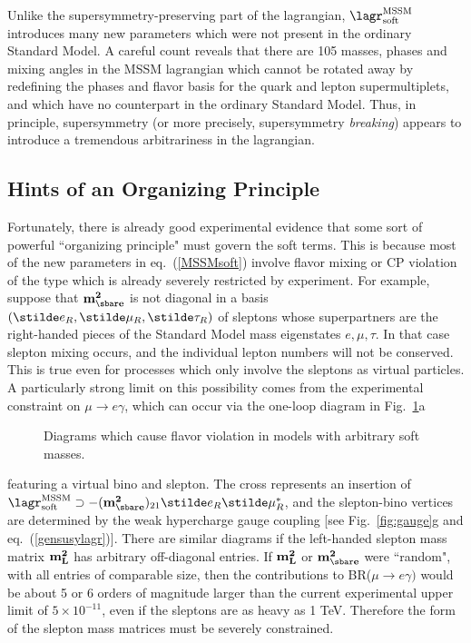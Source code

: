Unlike the supersymmetry-preserving part of the lagrangian,
$\lagr_{\rm soft}^{\rm MSSM}$ introduces many new parameters which were
not present in the ordinary Standard Model.
A careful count \cite{dimsut} reveals that there are 105 masses, phases and 
mixing angles in the MSSM lagrangian which cannot be rotated away
by redefining the phases and flavor basis for the quark and lepton
supermultiplets, and which have no counterpart in the ordinary
Standard Model.
Thus, in principle, supersymmetry (or more precisely,
supersymmetry {\it breaking}) appears to introduce a tremendous
arbitrariness in the lagrangian.

\subsection{Hints of an Organizing Principle}\label{subsec:mssm.hints}

Fortunately, there is already
good experimental evidence that some sort of powerful ``organizing
principle" must govern the soft terms. This is because most of the
new parameters in eq.~(\ref{MSSMsoft}) involve flavor mixing or
CP violation of the type which is already severely restricted by
experiment.\cite{flavorreview}
For example, suppose that $\bf m_{\sbar e}^2$ is not diagonal in a basis
$(\stilde e_R, \stilde \mu_R, \stilde \tau_R)$ of sleptons whose
superpartners are the right-handed pieces of the Standard Model
mass
eigenstates $e,\mu,\tau$.
In that case slepton mixing occurs, and the individual lepton numbers
will not be conserved.
This is true even for processes which only involve the sleptons
as virtual particles. A
particularly strong limit on this possibility
comes from the experimental constraint on $\mu\rightarrow e \gamma$,
\cite{muegamma}
which can occur via the one-loop diagram in Fig.~\ref{fig:flavor}a
\begin{figure}
\centerline{}
\caption{Diagrams which cause flavor violation in models with
arbitrary soft masses.
\label{fig:flavor}}
\end{figure}
featuring a virtual bino and slepton. The cross represents
an insertion of
$\lagr_{\rm soft}^{\rm MSSM} \supset
-({\bf m^2_{\sbar e}})_{21}\stilde e_R \stilde \mu^*_R$, and the
slepton-bino
vertices are determined by the weak hypercharge gauge coupling
[see Fig.~\ref{fig:gauge}g and eq.~(\ref{gensusylagr})]. There are similar
diagrams if the left-handed slepton mass matrix
$\bf m^2_L$ has arbitrary off-diagonal entries. If $\bf m^2_L$ or
${\bf m^2_{\sbar e}}$ were ``random", with all entries of comparable size,
then the contributions to BR($\mu\rightarrow e\gamma)$ would
be about 5 or 6 orders of magnitude larger than the current experimental
upper limit of $5\times 10^{-11}$, even if the sleptons are as heavy as 1
TeV. Therefore the form of the slepton mass matrices must be severely
constrained.

